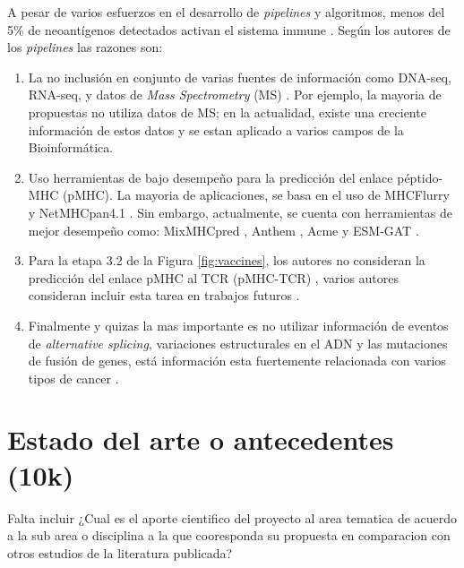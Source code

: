\documentclass[a4paper,11pt]{article}
\begin{document}
A pesar de varios esfuerzos en el desarrollo de \textit{pipelines} y algoritmos, menos del 5\% de neoantígenos detectados activan el sistema immune \cite{de2020neoantigen, mill2022neoms, bulik2019deep, bassani2015mass, yadav2014predicting}. Según los autores de los \textit{pipelines} las razones son: 

\begin{enumerate}
	\item La no inclusión en conjunto de varias fuentes de información como DNA-seq, RNA-seq, y datos de \textit{Mass Spectrometry} (MS) \cite{kim2018neopepsee}. Por ejemplo, la mayoria de  propuestas no utiliza datos de MS; en la actualidad, existe una creciente información de estos datos y se estan aplicado a varios campos de la Bioinformática.
	
	\item  Uso herramientas de bajo desempeño para la predicción del enlace péptido-MHC (pMHC). La mayoria de aplicaciones, se basa en el uso de MHCFlurry \cite{o2020mhcflurry} y NetMHCpan4.1 \cite{reynisson2020netmhcpan}. Sin embargo, actualmente, se cuenta con herramientas de mejor desempeño como: MixMHCpred \cite{gfeller2023improved},  Anthem \cite{mei2021anthem}, Acme \cite{hu2019acme} y ESM-GAT \cite{hashemi2023improved}.
	
	\item Para la etapa 3.2 de la Figura \ref{fig:vaccines}, los autores no consideran  la predicción del enlace pMHC al TCR (pMHC-TCR) , varios autores consideran incluir esta tarea en trabajos futuros  \cite{rubinsteyn2018computational}.
	
	\item Finalmente y quizas la mas importante es no utilizar información de eventos de \textit{alternative splicing}, variaciones estructurales en el ADN y las mutaciones de fusión de genes, está información esta fuertemente relacionada con varios tipos de cancer \cite{wood2020neoepiscope}.
\end{enumerate}

\section{Estado del arte o antecedentes (10k)}
	
Falta incluir ¿Cual es el aporte cientifico del proyecto al area tematica de acuerdo a la sub area o disciplina a la que cooresponda su propuesta en comparacion con otros estudios de la literatura publicada?
	
	
	
\end{document}
